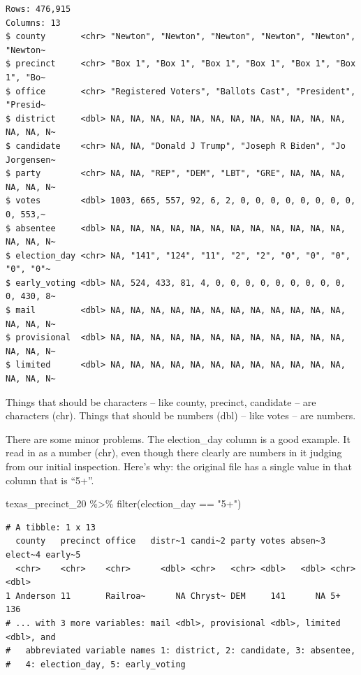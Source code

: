 \documentclass[
  letterpaper,
  DIV=11,
  numbers=noendperiod]{scrreprt}
\newenvironment{Shaded}{\begin{snugshade}}{\end{snugshade}}
\newcommand{\FunctionTok}[1]{\textcolor[rgb]{0.28,0.35,0.67}{#1}}
\newcommand{\NormalTok}[1]{\textcolor[rgb]{0.00,0.23,0.31}{#1}}
\newcommand{\SpecialCharTok}[1]{\textcolor[rgb]{0.37,0.37,0.37}{#1}}
\newcommand{\StringTok}[1]{\textcolor[rgb]{0.13,0.47,0.30}{#1}}
\begin{document}
\begin{verbatim}
Rows: 476,915
Columns: 13
$ county       <chr> "Newton", "Newton", "Newton", "Newton", "Newton", "Newton~
$ precinct     <chr> "Box 1", "Box 1", "Box 1", "Box 1", "Box 1", "Box 1", "Bo~
$ office       <chr> "Registered Voters", "Ballots Cast", "President", "Presid~
$ district     <dbl> NA, NA, NA, NA, NA, NA, NA, NA, NA, NA, NA, NA, NA, NA, N~
$ candidate    <chr> NA, NA, "Donald J Trump", "Joseph R Biden", "Jo Jorgensen~
$ party        <chr> NA, NA, "REP", "DEM", "LBT", "GRE", NA, NA, NA, NA, NA, N~
$ votes        <dbl> 1003, 665, 557, 92, 6, 2, 0, 0, 0, 0, 0, 0, 0, 0, 0, 553,~
$ absentee     <dbl> NA, NA, NA, NA, NA, NA, NA, NA, NA, NA, NA, NA, NA, NA, N~
$ election_day <chr> NA, "141", "124", "11", "2", "2", "0", "0", "0", "0", "0"~
$ early_voting <dbl> NA, 524, 433, 81, 4, 0, 0, 0, 0, 0, 0, 0, 0, 0, 0, 430, 8~
$ mail         <dbl> NA, NA, NA, NA, NA, NA, NA, NA, NA, NA, NA, NA, NA, NA, N~
$ provisional  <dbl> NA, NA, NA, NA, NA, NA, NA, NA, NA, NA, NA, NA, NA, NA, N~
$ limited      <dbl> NA, NA, NA, NA, NA, NA, NA, NA, NA, NA, NA, NA, NA, NA, N~
\end{verbatim}

Things that should be characters -- like county, precinct, candidate --
are characters (chr). Things that should be numbers (dbl) -- like votes
-- are numbers.

There are some minor problems. The election\_day column is a good
example. It read in as a number (chr), even though there clearly are
numbers in it judging from our initial inspection. Here's why: the
original file has a single value in that column that is ``5+''.

\begin{Shaded}
\begin{Highlighting}[]
\NormalTok{texas\_precinct\_20 }\SpecialCharTok{\%\textgreater{}\%} \FunctionTok{filter}\NormalTok{(election\_day }\SpecialCharTok{==} \StringTok{"5+"}\NormalTok{)}
\end{Highlighting}
\end{Shaded}

\begin{verbatim}
# A tibble: 1 x 13
  county   precinct office   distr~1 candi~2 party votes absen~3 elect~4 early~5
  <chr>    <chr>    <chr>      <dbl> <chr>   <chr> <dbl>   <dbl> <chr>     <dbl>
1 Anderson 11       Railroa~      NA Chryst~ DEM     141      NA 5+          136
# ... with 3 more variables: mail <dbl>, provisional <dbl>, limited <dbl>, and
#   abbreviated variable names 1: district, 2: candidate, 3: absentee,
#   4: election_day, 5: early_voting
\end{verbatim}
\end{document}

